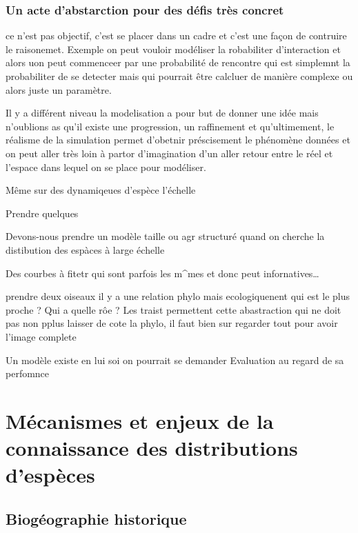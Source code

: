 \subsubsection{Un acte d'abstarction pour des défis très
concret}\label{un-acte-dabstarction-pour-des-duxe9fis-truxe8s-concret}

ce n'est pas objectif, c'est se placer dans un cadre et c'est une façon
de contruire le raisonemet. Exemple on peut vouloir modéliser la
robabiliter d'interaction et alors uon peut commenceer par une
probabilité de rencontre qui est simplemnt la probabiliter de se
detecter mais qui pourrait être calcluer de manière complexe ou alors
juste un paramètre.

Il y a différent niveau la modelisation a pour but de donner une idée
mais n'oublions as qu'il existe une progression, un raffinement et
qu'ultimement, le réalisme de la simulation permet d'obetnir
préscisement le phénomène données et on peut aller très loin à partor
d'imagination d'un aller retour entre le réel et l'espace dans lequel on
se place pour modéliser.

Même sur des dynamiqeues d'espèce l'échelle

Prendre quelques

Devons-nous prendre un modèle taille ou agr structuré quand on cherche
la distibution des espàces à large échelle

Des courbes à fitetr qui sont parfois les m\^{}mes et donc peut
infornatives\ldots{}

prendre deux oiseaux il y a une relation phylo mais ecologiquenent qui
est le plus proche ? Qui a quelle rôe ? Les traist permettent cette
abastraction qui ne doit pas non pplus laisser de cote la phylo, il faut
bien sur regarder tout pour avoir l'image complete

Un modèle existe en lui soi on pourrait se demander Evaluation au regard
de sa perfomnce

\section*{Mécanismes et enjeux de la connaissance des distributions
d'espèces}\label{muxe9canismes-et-enjeux-de-la-connaissance-des-distributions-despuxe8ces}

\subsection{Biogéographie historique}\label{bioguxe9ographie-historique}

